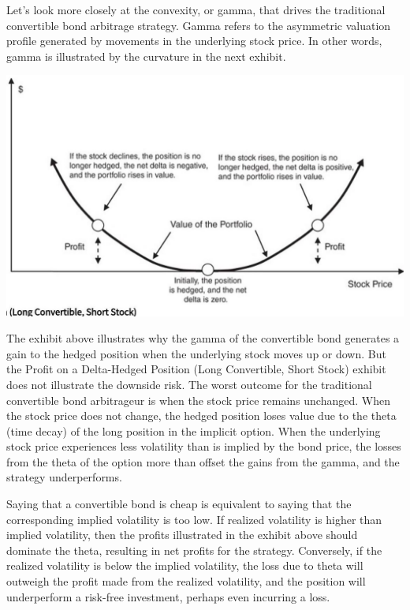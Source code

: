 \documentclass[11pt]{article}
\begin{document}
Let's look more closely at the convexity, or gamma, that drives the traditional convertible bond arbitrage strategy. Gamma refers to the asymmetric valuation profile generated by movements in the underlying stock price. In other words, gamma is illustrated by the curvature in the next exhibit.

\begin{center}
\includegraphics[max width=\textwidth]{2024_04_09_d2bdb6aa136bcf7c7f5eg-07}
\end{center}

The exhibit above illustrates why the gamma of the convertible bond generates a gain to the hedged position when the underlying stock moves up or down. But the Profit on a Delta-Hedged Position (Long Convertible, Short Stock) exhibit does not illustrate the downside risk. The worst outcome for the traditional convertible bond arbitrageur is when the stock price remains unchanged. When the stock price does not change, the hedged position loses value due to the theta (time decay) of the long position in the implicit option. When the underlying stock price experiences less volatility than is implied by the bond price, the losses from the theta of the option more than offset the gains from the gamma, and the strategy underperforms.

Saying that a convertible bond is cheap is equivalent to saying that the corresponding implied volatility is too low. If realized volatility is higher than implied volatility, then the profits illustrated in the exhibit above should dominate the theta, resulting in net profits for the strategy. Conversely, if the realized volatility is below the implied volatility, the loss due to theta will outweigh the profit made from the realized volatility, and the position will underperform a risk-free investment, perhaps even incurring a loss.
\end{document}
